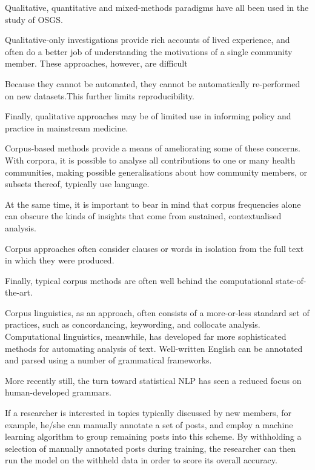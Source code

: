 \documentclass{article}
\begin{document}
Qualitative, quantitative and mixed-methods paradigms have all been used in the study of OSGS.

Qualitative-only investigations provide rich accounts of lived experience, and often do a better job of understanding the motivations of a single community member. These approaches, however, are difficult

Because they cannot be automated, they cannot be automatically re-performed on new datasets.This further limits reproducibility.

Finally, qualitative approaches may be of limited use in informing policy and practice in mainstream medicine.

Corpus-based methods provide a means of ameliorating some of these concerns. With corpora, it is possible to analyse all contributions to one or many health communities, making possible generalisations about how community members, or subsets thereof, typically use language.

At the same time, it is important to bear in mind that corpus frequencies alone can obscure the kinds of insights that come from sustained, contextualised analysis.

Corpus approaches often consider clauses or words in isolation from the full text in which they were produced.

Finally, typical corpus methods are often well behind the computational state-of-the-art.


Corpus linguistics, as an approach, often consists of a more-or-less standard set of practices, such as concordancing, keywording, and collocate analysis. Computational linguistics, meanwhile, has developed far more sophisticated methods for automating analysis of text. Well-written English can be annotated and parsed using a number of grammatical frameworks.

More recently still, the turn toward statistical NLP has seen a reduced focus on human-developed grammars.

If a researcher is interested in topics typically discussed by new members, for example, he\slash she can manually annotate a set of posts, and employ a machine learning algorithm to group remaining posts into this scheme. By withholding a selection of manually annotated posts during training, the researcher can then run the model on the withheld data in order to score its overall accuracy.
\end{document}
